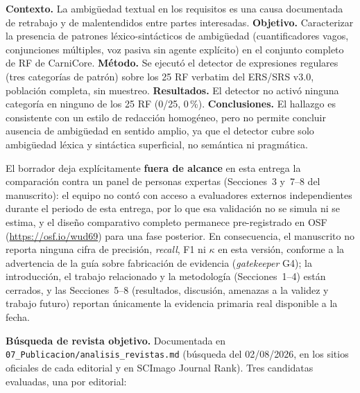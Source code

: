 \documentclass[11pt,a4paper]{article}
\begin{document}
\textbf{Contexto.} La ambigüedad textual en los requisitos es una causa documentada de retrabajo y de malentendidos entre partes interesadas. \textbf{Objetivo.} Caracterizar la presencia de patrones léxico-sintácticos de ambigüedad (cuantificadores vagos, conjunciones múltiples, voz pasiva sin agente explícito) en el conjunto completo de RF de CarniCore. \textbf{Método.} Se ejecutó el detector de expresiones regulares (tres categorías de patrón) sobre los 25 RF verbatim del ERS/SRS v3.0, población completa, sin muestreo. \textbf{Resultados.} El detector no activó ninguna categoría en ninguno de los 25 RF (0/25, 0\,\%). \textbf{Conclusiones.} El hallazgo es consistente con un estilo de redacción homogéneo, pero no permite concluir ausencia de ambigüedad en sentido amplio, ya que el detector cubre solo ambigüedad léxica y sintáctica superficial, no semántica ni pragmática.

El borrador deja explícitamente \textbf{fuera de alcance} en esta entrega la comparación contra un panel de personas expertas (Secciones~3 y~7--8 del manuscrito): el equipo no contó con acceso a evaluadores externos independientes durante el periodo de esta entrega, por lo que esa validación no se simula ni se estima, y el diseño comparativo completo permanece pre-registrado en OSF (\url{https://osf.io/wud69}) para una fase posterior. En consecuencia, el manuscrito no reporta ninguna cifra de precisión, \textit{recall}, F1 ni $\kappa$ en esta versión, conforme a la advertencia de la guía sobre fabricación de evidencia (\textit{gatekeeper} G4); la introducción, el trabajo relacionado y la metodología (Secciones~1--4) están cerrados, y las Secciones~5--8 (resultados, discusión, amenazas a la validez y trabajo futuro) reportan únicamente la evidencia primaria real disponible a la fecha.

\textbf{Búsqueda de revista objetivo.} Documentada en \texttt{07\_Publicacion/analisis\_revistas.md} (búsqueda del 02/08/2026, en los sitios oficiales de cada editorial y en SCImago Journal Rank). Tres candidatas evaluadas, una por editorial:
\end{document}
